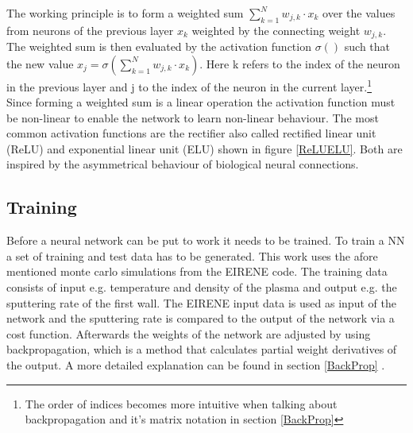 			The working principle is to form a weighted sum $\sum_{k=1}^{N} w_{j,k} \cdot x_{k}$ over the values from neurons of the previous layer $x_{k}$ weighted by the connecting weight $w_{j,k}$. The weighted sum is then evaluated by the activation function $\sigma()$ such that the new value $x_j = \sigma(\sum_{k=1}^{N} w_{j,k} \cdot x_{k})$. Here k refers to the index of the neuron in the previous layer and j to the index of the neuron in the current layer.\footnote{The order of indices becomes more intuitive when talking about backpropagation and it's matrix notation in section \ref{BackProp}}\\
			Since forming a weighted sum is a linear operation the activation function must be non-linear to enable the network to learn non-linear behaviour. The most common activation functions are the rectifier also called rectified linear unit (ReLU) and exponential linear unit (ELU) shown in figure \ref{ReLUELU}. Both are inspired by the asymmetrical behaviour of biological neural connections.\\
		
		\subsection{Training}
			Before a neural network can be put to work it needs to be trained. To train a NN a set of training and test data has to be generated. This work uses the afore mentioned monte carlo simulations from the EIRENE code.
			The training data consists of input e.g. temperature and density of the plasma and output e.g. the sputtering rate of the first wall. The EIRENE input data is used as input of the network and the sputtering rate is compared to the output of the network via a cost function. Afterwards the weights of the network are adjusted by using backpropagation, which is a method that calculates partial weight derivatives of the output. A more detailed explanation can be found in section \ref{BackProp} .\\
